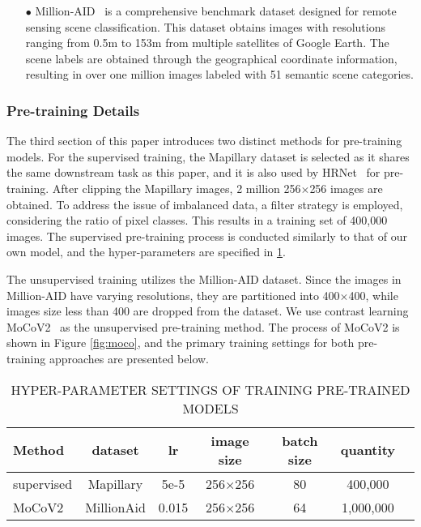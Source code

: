 \documentclass[journal]{IEEEtran}
\begin{document}
\begin{itemize}
\item[$\bullet$] Million-AID~\cite{long2021creating} is a comprehensive benchmark dataset designed for remote sensing scene classification. This dataset obtains images with resolutions ranging from 0.5m to 153m from multiple satellites of Google Earth. The scene labels are obtained through the geographical coordinate information, resulting in over one million images labeled with 51 semantic scene categories.
\end{itemize}


\subsubsection{Pre-training Details}
 The third section of this paper introduces two distinct methods for pre-training models. For the supervised training, the Mapillary dataset is selected as it shares the same downstream task as this paper, and it is also used by HRNet~\cite{zhang2019multi} for pre-training. After clipping the Mapillary images, 2 million 256$\times$256 images are obtained. To address the issue of imbalanced data, a filter strategy is employed, considering the ratio of pixel classes. This results in a training set of 400,000 images. The supervised pre-training process is conducted similarly to that of our own model, and the hyper-parameters are specified in \ref{table:2}.

The unsupervised training utilizes the Million-AID dataset. Since the images in Million-AID have varying resolutions, they are partitioned into 400$\times$400, while images size less than 400 are dropped from the dataset. We use contrast learning MoCoV2~\cite{he2020momentum} as the unsupervised pre-training method. The process of MoCoV2 is shown in Figure \ref{fig:moco}, and the primary training settings for both pre-training approaches are presented below.

\begin{table}[!ht]
  \begin{center}
  \scriptsize
    \caption{HYPER-PARAMETER SETTINGS OF TRAINING PRE-TRAINED MODELS}
    \begin{tabular}{l|c c c c c c}
        \hline
      \textbf{Method} & \textbf{dataset} & \textbf{lr} & 
      \textbf{image size} & \textbf{batch size} & \textbf{quantity}\\
      \hline
      supervised & Mapillary & 5e-5 & 256$\times$256 & 80 & 400,000\\
      MoCoV2 & MillionAid & 0.015 & 256$\times$256 & 64 & 1,000,000\\
      \hline
    \end{tabular}
  \end{center}
  \label{table:2}
\end{table}
\end{document}
